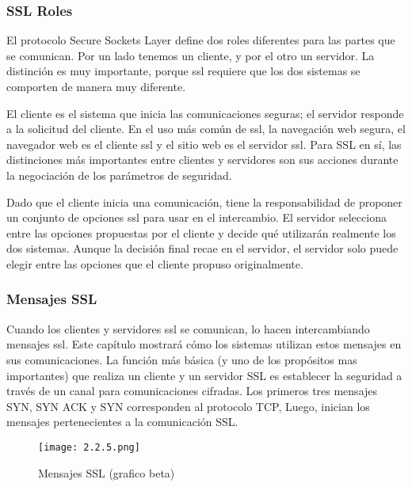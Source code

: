 \subsubsection*{SSL Roles}
El protocolo Secure Sockets Layer define dos roles diferentes para las
partes que se comunican. Por un lado tenemos un cliente, y por el otro
un servidor. La distinción es muy importante, porque ssl requiere que 
los dos sistemas se comporten de manera muy diferente. 

El cliente es el sistema que inicia las comunicaciones seguras; el 
servidor responde a la solicitud del cliente. En el uso más común 
de ssl, la navegación web segura, el navegador web es el cliente ssl 
y el sitio web es el servidor ssl. Para SSL en sí, las distinciones 
más importantes entre clientes y servidores son sus acciones durante 
la negociación de los parámetros de seguridad.

Dado que el cliente inicia una comunicación, tiene la responsabilidad 
de proponer un conjunto de opciones ssl para usar en el intercambio. 
El servidor selecciona entre las opciones propuestas por el cliente 
y decide qué utilizarán realmente los dos sistemas. Aunque la decisión 
final recae en el servidor, el servidor solo puede elegir entre las 
opciones que el cliente propuso originalmente.


\subsubsection*{Mensajes SSL}
Cuando los clientes y servidores ssl se comunican, lo hacen 
intercambiando mensajes ssl. Este capítulo mostrará cómo los 
sistemas utilizan estos mensajes en sus comunicaciones. La función 
más básica (y uno de los propósitos mas importantes) que realiza 
un cliente y un servidor SSL es establecer la seguridad a través
de un canal para comunicaciones cifradas. Los primeros tres mensajes
SYN, SYN ACK y SYN corresponden al protocolo TCP, Luego, inician los 
mensajes pertenecientes a la comunicación SSL.


\begin{center}
   \begin{figure}   
      \begin{center}
         \texttt{[image: 2.2.5.png]}
      \end{center}
      \caption{Mensajes SSL (grafico beta)}
   \end{figure}
\end{center}


